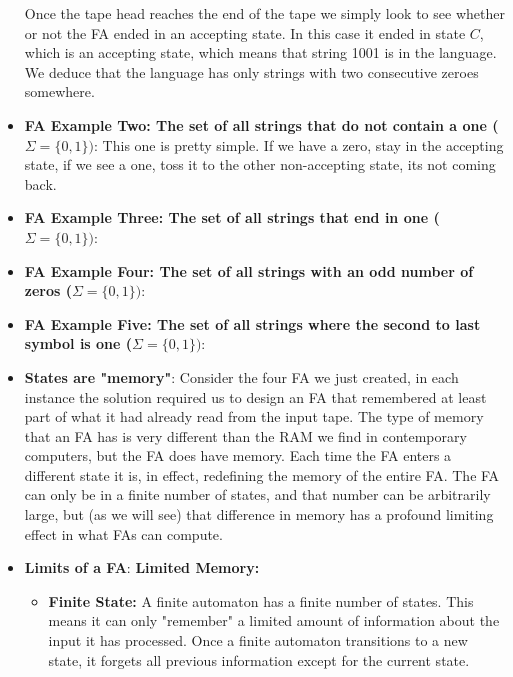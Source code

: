 \documentclass{report}
\begin{document}
\begin{itemize}
        Once the tape head reaches the end of the tape we simply look to see whether or not the FA ended in an accepting state.
        \bigbreak \noindent 
        In this case it ended in state $C$, which is an accepting state, which means that string 1001 is in the language.
        \bigbreak \noindent 
        \bigbreak \noindent 
        We deduce that the language has only strings with two consecutive zeroes somewhere.
        \pagebreak \bigbreak \noindent
    \item \textbf{FA Example Two: The set of all strings that do not contain a one ($\Sigma = \{0,1\})$}:
        \bigbreak \noindent 
        \bigbreak \noindent 
        This one is pretty simple. If we have a zero, stay in the accepting state, if we see a one, toss it to the other non-accepting state, its not coming back.
    \item \textbf{FA Example Three: The set of all strings that end in one ($\Sigma = \{0,1\})$}:
        \bigbreak \noindent 
    \item \textbf{FA Example Four: The set of all strings with an odd number of zeros ($\Sigma = \{0,1\})$}:
        \bigbreak \noindent 
    \item \textbf{FA Example Five: The set of all strings where the second to last symbol is one ($\Sigma = \{0,1\})$}:
        \bigbreak \noindent 
    \item \textbf{States are "memory"}: Consider the four FA we just created, in each instance the solution required us to design an FA that remembered at least part of what it had already read from the input tape. The type of memory that an FA has is very different than the RAM we find in
        contemporary computers, but the FA does have memory. Each time the FA enters a different state it is, in effect, redefining the memory of the
        entire FA. The FA can only be in a finite number of states, and that number can be arbitrarily
        large, but (as we will see) that difference in memory has a profound limiting effect in
        what FAs can compute.
        \bigbreak \noindent 
    \item \textbf{Limits of a FA}:
        \bigbreak \noindent 
        \textbf{Limited Memory:}
        \begin{itemize}
            \item \textbf{Finite State:} A finite automaton has a finite number of states. This means it can only "remember" a limited amount of information about the input it has processed. Once a finite automaton transitions to a new state, it forgets all previous information except for the current state.

\end{itemize}
\end{itemize}
\end{document}
